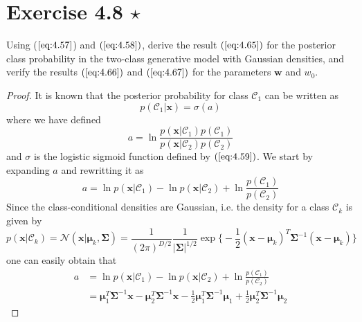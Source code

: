 \section*{Exercise 4.8 $\star$}
Using ($\ref{eq:4.57}$) and $(\ref{eq:4.58})$, derive the result $(\ref{eq:4.65})$ 
for the posterior class probability in the two-class generative model with Gaussian
densities, and verify the results $(\ref{eq:4.66})$ and $(\ref{eq:4.67})$ for the
parameters $\mathbf{w}$ and $w_0$.

\vspace{1em}

\begin{proof}
    It is known that the posterior probability for class $\mathcal{C}_1$ can
    be written as
    \begin{equation*}
        p(\mathcal{C}_1 | \mathbf{x}) = \sigma(a)
        \tag{4.57}\label{eq:4.57}
    \end{equation*}
    where we have defined 
    \begin{equation*}
        a = \ln \frac{p(\mathbf{x} | \mathcal{C}_1)p(\mathcal{C}_1)}
            {p(\mathbf{x} | \mathcal{C}_2)p(\mathcal{C}_2)}
        \tag{4.58}\label{eq:4.58}
    \end{equation*}
    and $\sigma$ is the logistic sigmoid function defined by $(\ref{eq:4.59})$.
    We start by expanding $a$ and rewritting it as
    \[
        a = \ln p(\mathbf{x} | \mathcal{C}_1) - \ln p(\mathbf{x} | \mathcal{C}_2)
            + \ln \frac{p(\mathcal{C}_1)}{p(\mathcal{C}_2)}
    \] 
    Since the class-conditional densities are Gaussian, i.e. the density
    for a class $\mathcal{C}_k$ is given by
    \begin{equation*}
        p(\mathbf{x} | \mathcal{C}_k) = \mathcal{N}(\mathbf{x} | \bm{\mu}_k, \mathbf{\Sigma})
        = \frac{1}{(2\pi)^{D/2}} \frac{1}{|\mathbf{\Sigma}|^{1/2}}
        \exp \bigg\{-\frac{1}{2} (\mathbf{x} - \bm{\mu}_k)^T\mathbf{\Sigma}^{-1}
        (\mathbf{x} - \bm{\mu}_k)\bigg\}
        \tag{4.64}\label{eq:4.64}
    \end{equation*}
    one can easily obtain that
    \begin{align*}
        a 
        &= \ln p(\mathbf{x} | \mathcal{C}_1) - \ln p(\mathbf{x} | \mathcal{C}_2) 
        + \ln \frac{p(\mathcal{C}_1)}{p(\mathcal{C}_2)}\\
        &= \bm{\mu}_1^T\mathbf{\Sigma}^{-1}\mathbf{x}
        - \bm{\mu}_2^T\mathbf{\Sigma}^{-1}\mathbf{x} 
        - \frac{1}{2} \bm{\mu}_1^T\mathbf{\Sigma}^{-1}\bm{\mu}_1
        + \frac{1}{2} \bm{\mu}_2^T\mathbf{\Sigma}^{-1}\bm{\mu}_2

\end{align*}
\end{proof}
